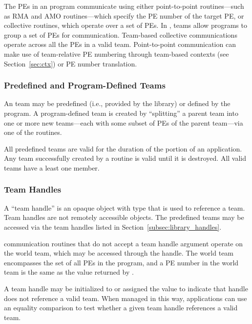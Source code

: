 The \acp{PE} in an \openshmem program communicate using either
point-to-point routines---such as \ac{RMA} and \ac{AMO} routines---which specify the \ac{PE} number of the target
\ac{PE}, or collective routines, which operate over a set of \acp{PE}.
In \openshmem, teams allow programs to group a set of \acp{PE} for
communication.
Team-based collective communications operate across all the \acp{PE}
in a valid team.
Point-to-point communication can make use of team-relative \ac{PE}
numbering through team-based contexts (see Section~\ref{sec:ctx}) or
\ac{PE} number translation.

\subsubsection*{Predefined and Program-Defined Teams}

An \openshmem team may be predefined (i.e., provided by the \openshmem
library) or defined by the \openshmem program.
A program-defined team is created by ``splitting'' a parent team into
one or more new teams---each with some subset of \acp{PE} of the
parent team---via one of the  routines.

All predefined teams are valid for the duration of the \openshmem
portion of an application.
Any team successfully created by a 
routine is valid until it is destroyed.
All valid teams have a least one member.

\subsubsection*{Team Handles}

A ``team handle'' is an opaque object with type 
that is used to reference a team.
Team handles are not remotely accessible objects.
The predefined teams may be accessed via the team handles listed in
Section~\ref{subsec:library_handles}.

\openshmem communication routines that do not accept a team handle
argument operate on the world team, which may be accessed through
the  handle.
The world team encompasses the set of all \acp{PE} in the \openshmem
program, and a \ac{PE} number in the world team is the same as the
value returned by .

A team handle may be initialized to or assigned the value
 to indicate that handle does not
reference a valid team.
When managed in this way, applications can use an equality comparison
to test whether a given team handle references a valid team.

